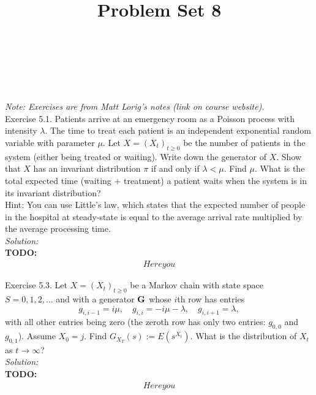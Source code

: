 \documentclass[10pt]{amsart}
\begin{document}
\noindent
{} \\
 \\
 \\
\title{Problem Set 8}
\maketitle

{\it Note: Exercises are from Matt Lorig's notes (link on course website).} \\

 Exercise 5.1.
Patients arrive at an emergency room as a Poisson process with intensity $\lambda$.
The time to treat each patient is an independent exponential random variable with parameter $\mu$.
Let $X = (X_t)_{t \geq 0}$ be the number of patients in the system (either being treated or waiting).
Write down the generator of $X$.
Show that $X$ has an invariant distribution $\pi$ if and only if $\lambda < \mu$.
Find $\mu$.
What is the total expected time (waiting + treatment) a patient waits when the system is in its invariant distribution? \\

\noindent
Hint: You can use Little's law, which states that the expected number of people in the hospital at steady-state is equal to the average arrival rate multiplied by the average processing time. \\

\noindent
\textit{Solution:} \\
\textbf{TODO:} \\
\begin{align*}
Here you
\end{align*}

\newpage


 Exercise 5.3.
Let $X = (X_t)_{t \geq 0}$ be a Markov chain with state space $S = {0, 1, 2, \dots}$ and with a generator ${ \bf G} $ whose $i$th row has entries
$$
g_{i, i-1} = i\mu, \quad g_{i, i} = -i \mu - \lambda, \quad g_{i, i+1} = \lambda,
$$
with all other entries being zero (the zeroth row has only two entries: $g_{0,0}$ and $g_{0,1}$).
Assume $X_0 = j$.
Find $G_{X_T}(s) := E(s^{X_t})$.
What is the distribution of $X_t$ as $t \rightarrow \infty$? \\

\noindent
\textit{Solution:} \\
\textbf{TODO:} \\
\begin{align*}
Here you
\end{align*}
\end{document}

